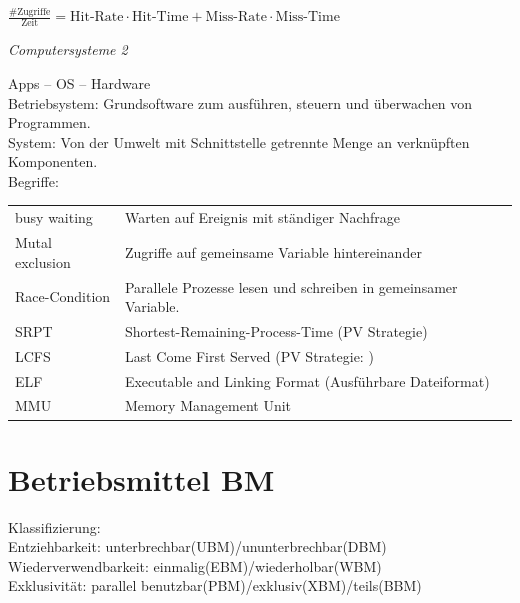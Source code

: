 \documentclass[fs]{latex4ei}
\begin{document}
\begin{multicols}{4}
$\frac{\text{\#Zugriffe}}{\text{Zeit}} = \text{Hit-Rate} \cdot \text{Hit-Time} + \text{Miss-Rate} \cdot \text{Miss-Time}$ \\













	\newpage
	\parbox{4cm}{
		\emph{\Large{Computersysteme 2}}
	}

Apps -- OS -- Hardware\\
Betriebsystem: Grundsoftware zum ausführen, steuern und überwachen von Programmen.\\
System: Von der Umwelt mit Schnittstelle getrennte Menge an verknüpften Komponenten.\\

Begriffe:\\
\begin{tabular}{lp{4.5cm}}
	busy waiting & Warten auf Ereignis mit ständiger Nachfrage\\
	Mutal exclusion & Zugriffe auf gemeinsame Variable hintereinander\\
	Race-Condition & Parallele Prozesse lesen und schreiben in gemeinsamer Variable.\\
	SRPT & Shortest-Remaining-Process-Time (PV Strategie)\\
	LCFS & Last Come First Served (PV Strategie: )\\
	ELF & Executable and Linking Format (Ausführbare Dateiformat)\\
	MMU & Memory Management Unit\\

\end{tabular}

\section{Betriebsmittel BM}
Klassifizierung: \\
Entziehbarkeit: unterbrechbar(UBM)/ununterbrechbar(DBM)\\
Wiederverwendbarkeit: einmalig(EBM)/wiederholbar(WBM)\\
Exklusivität: parallel benutzbar(PBM)/exklusiv(XBM)/teils(BBM)\\




\end{multicols}
\end{document}
